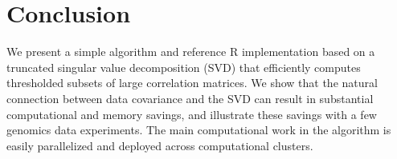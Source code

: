 \documentclass{article}
\let\proglang=\textsf
\numberwithin{algorithmctr}{section}
\begin{document}
\section{Conclusion}\label{conclusion}

We present a simple algorithm and reference \proglang{R} implementation based
on a truncated singular value decomposition (SVD) that efficiently computes
thresholded subsets of large correlation  matrices.  We show that the natural
connection between data covariance and the SVD can result in substantial
computational and memory savings, and illustrate these savings with a few
genomics data experiments.  The main computational work in the algorithm is
easily parallelized and deployed across computational clusters.

{}

\end{document}
